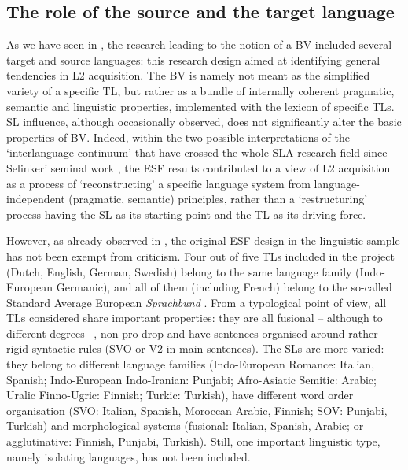 \documentclass[output=paper]{langscibook}
\begin{document}
\subsection{The role of the source and the target language}\label{sec:benazzo:4.3}
\largerpage
As we have seen in , the research leading to the notion of a BV included several target and source languages: this research design aimed at identifying general tendencies in L2 acquisition. The BV is namely not meant as the simplified variety of a specific TL, but rather as a bundle of internally coherent pragmatic, semantic and linguistic properties, implemented with the lexicon of specific TLs. SL influence, although occasionally observed, does not significantly alter the basic properties of BV. Indeed, within the two possible interpretations of the ‘interlanguage continuum’ that have crossed the whole SLA research field since Selinker’ seminal work \citep{Corder1978}, the ESF results contributed to a view of L2 acquisition as a process of ‘reconstructing’ a specific language system from language-independent (pragmatic, semantic) principles, rather than a ‘restructuring’ process having the SL as its starting point and the TL as its driving force. 

However, as already observed in , the original ESF design in the linguistic sample has not been exempt from criticism. Four out of five TLs included in the project (Dutch, English, German, Swedish) belong to the same language family (Indo-European Germanic), and all of them (including French) belong to the so-called Standard Average European \textit{Sprachbund} \citep{Dahl1990}. From a typological point of view, all TLs considered share important properties: they are all fusional – although to different degrees –, non pro-drop and have sentences organised around rather rigid syntactic rules (SVO or V2 in main sentences). The SLs are more varied: they belong to different language families (Indo-European Romance: Italian, Spanish; Indo-European Indo-Iranian: Punjabi; Afro-Asiatic Semitic: Arabic; Uralic Finno-Ugric: Finnish; Turkic: Turkish), have different word order organisation (SVO: Italian, Spanish, Moroccan Arabic, Finnish; SOV: Punjabi, Turkish) and morphological systems (fusional: Italian, Spanish, Arabic; or agglutinative: Finnish, Punjabi, Turkish). Still, one important linguistic type, namely isolating languages, has not been included. 
\end{document}
